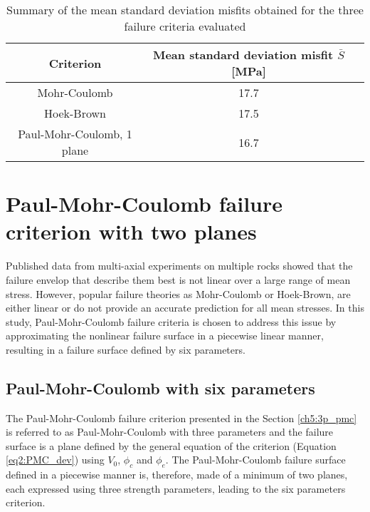 \begin{table}
    \centering
    \captionsetup{justification=centering}
    \caption{Summary of the mean standard deviation misfits obtained for the three failure criteria evaluated}
    \begin{tabular}{ccc}
        \hline 
        Criterion & Mean standard deviation misfit $\bar{S}$ [\si{MPa}] \\
        \hline
        \hline
        Mohr-Coulomb & 17.7 \\
        Hoek-Brown & 17.5 \\
        Paul-Mohr-Coulomb, 1 plane & 16.7 \\
        \hline
    \end{tabular}
    \label{tb5:stand_dev}
\end{table}

\section{Paul-Mohr-Coulomb failure criterion with two planes}\label{ch5:PMC}

Published data from multi-axial experiments on multiple rocks showed that the failure envelop that describe them best is not linear over a large range of mean stress. However, popular failure theories as Mohr-Coulomb or Hoek-Brown, are either linear or do not provide an accurate prediction for all mean stresses. In this study, Paul-Mohr-Coulomb failure criteria is chosen to address this issue by approximating the nonlinear failure surface in a piecewise linear manner, resulting in a failure surface defined by six parameters.

\subsection{Paul-Mohr-Coulomb with six parameters}\label{ch5:PMC_theo_6p}

The Paul-Mohr-Coulomb failure criterion presented in the Section \ref{ch5:3p_pmc} is referred to as Paul-Mohr-Coulomb with three parameters and the failure surface is a plane defined by the general equation of the criterion (Equation \ref{eq2:PMC_dev}) using $V_0$, $\phi_c$ and $\phi_e$. The Paul-Mohr-Coulomb failure surface defined in a piecewise manner is, therefore, made of a minimum of two planes, each expressed using three strength parameters, leading to the six parameters criterion.

